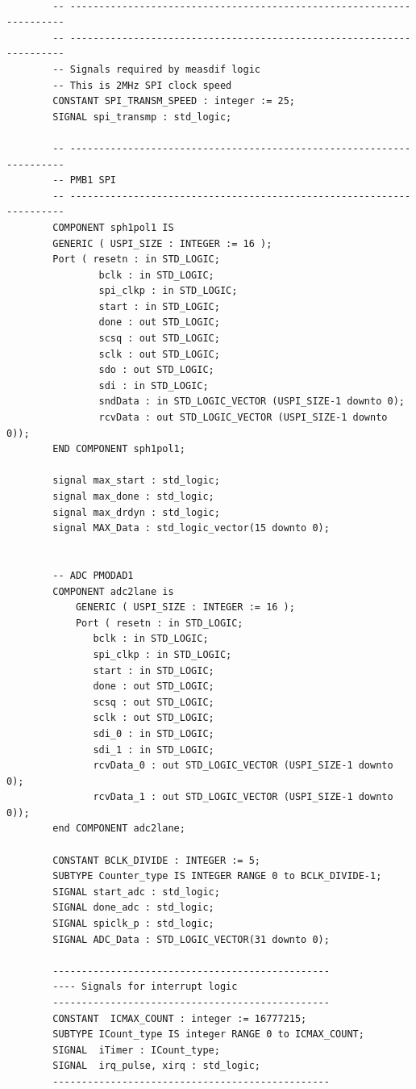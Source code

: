 \begin{verbatim}
    
        -- ---------------------------------------------------------------------
        -- ---------------------------------------------------------------------
        -- Signals required by measdif logic
        -- This is 2MHz SPI clock speed
        CONSTANT SPI_TRANSM_SPEED : integer := 25;
        SIGNAL spi_transmp : std_logic;
    
        -- ---------------------------------------------------------------------
        -- PMB1 SPI
        -- ---------------------------------------------------------------------
        COMPONENT sph1pol1 IS
        GENERIC ( USPI_SIZE : INTEGER := 16 );
        Port ( resetn : in STD_LOGIC;
                bclk : in STD_LOGIC;
                spi_clkp : in STD_LOGIC;
                start : in STD_LOGIC;
                done : out STD_LOGIC;
                scsq : out STD_LOGIC;
                sclk : out STD_LOGIC;
                sdo : out STD_LOGIC;
                sdi : in STD_LOGIC;
                sndData : in STD_LOGIC_VECTOR (USPI_SIZE-1 downto 0);
                rcvData : out STD_LOGIC_VECTOR (USPI_SIZE-1 downto 0));
        END COMPONENT sph1pol1;
    
        signal max_start : std_logic;
        signal max_done : std_logic;
        signal max_drdyn : std_logic;
        signal MAX_Data : std_logic_vector(15 downto 0);
    
    
        -- ADC PMODAD1
        COMPONENT adc2lane is
            GENERIC ( USPI_SIZE : INTEGER := 16 );
            Port ( resetn : in STD_LOGIC;
               bclk : in STD_LOGIC;
               spi_clkp : in STD_LOGIC;
               start : in STD_LOGIC;
               done : out STD_LOGIC;
               scsq : out STD_LOGIC;
               sclk : out STD_LOGIC;
               sdi_0 : in STD_LOGIC;
               sdi_1 : in STD_LOGIC;
               rcvData_0 : out STD_LOGIC_VECTOR (USPI_SIZE-1 downto 0);
               rcvData_1 : out STD_LOGIC_VECTOR (USPI_SIZE-1 downto 0));
        end COMPONENT adc2lane;
    
        CONSTANT BCLK_DIVIDE : INTEGER := 5;
        SUBTYPE Counter_type IS INTEGER RANGE 0 to BCLK_DIVIDE-1;
        SIGNAL start_adc : std_logic;
        SIGNAL done_adc : std_logic;
        SIGNAL spiclk_p : std_logic;
        SIGNAL ADC_Data : STD_LOGIC_VECTOR(31 downto 0);
    
        ------------------------------------------------
        ---- Signals for interrupt logic
        ------------------------------------------------
        CONSTANT  ICMAX_COUNT : integer := 16777215;
        SUBTYPE ICount_type IS integer RANGE 0 to ICMAX_COUNT;
        SIGNAL  iTimer : ICount_type;
        SIGNAL  irq_pulse, xirq : std_logic;
        ------------------------------------------------
    

\end{verbatim}
